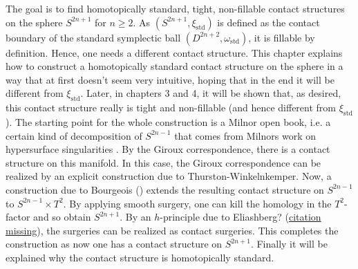 The goal is to find homotopically standard, tight, non-fillable contact structures on the sphere $S^{2n+1}$ for $n \geq 2$.
As $(S^{2n+1}, \xi_\mathrm{std})$ is defined as the contact boundary of the standard symplectic ball $(D^{2n+2}, \omega_\mathrm{std})$,
it is fillable by definition.
Hence, one needs a different contact structure.
This chapter explains how to construct a homotopically standard contact structure on the sphere in a way that at first doesn't seem very intuitive,
hoping that in the end it will be different from $\xi_\mathrm{std}$.
Later, in chapters 3 and 4, it will be shown that, as desired, this contact structure really is tight and non-fillable (and hence different from $\xi_\mathrm{std}$).
The starting point for the whole construction is a Milnor open book, i.e. a certain kind of decomposition of $S^{2n-1}$ that comes from
Milnors work on hypersurface singularities \cite{Milnor69}.
By the Giroux correspondence, there is a contact structure on this manifold.
In this case, the Giroux correspondence can be realized by an explicit construction due to Thurston-Winkelnkemper.
Now, a construction due to Bourgeois (\cite{Bourgeois02}) extends the resulting contact structure on $S^{2n-1}$ to $S^{2n-1}\times T^2$.
By applying smooth surgery, one can kill the homology in the $T^2$-factor and so obtain $S^{2n+1}$.
By an $h$-principle due to Eliashberg? (\underline{citation missing}), the surgeries can be realized as contact surgeries.
This completes the construction as now one has a contact structure on $S^{2n+1}$.
Finally it will be explained why the contact structure is homotopically standard.